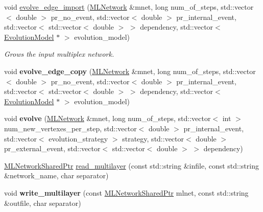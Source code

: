 \begin{DoxyCompactItemize}
\item 
void \hyperlink{namespacemlnet_a2c2827feaeced0d47c7d4180e0204ca4}{evolve\+\_\+edge\+\_\+import} (\hyperlink{classmlnet_1_1_m_l_network}{M\+L\+Network} \&mnet, long num\+\_\+of\+\_\+steps, std\+::vector$<$ double $>$ pr\+\_\+no\+\_\+event, std\+::vector$<$ double $>$ pr\+\_\+internal\+\_\+event, std\+::vector$<$ std\+::vector$<$ double $>$ $>$ dependency, std\+::vector$<$ \hyperlink{classmlnet_1_1_evolution_model}{Evolution\+Model} $\ast$ $>$ evolution\+\_\+model)
\begin{DoxyCompactList}\small\item\em Grows the input multiplex network. \end{DoxyCompactList}\item 
\hypertarget{namespacemlnet_adc031181ba00c2b421f33bbc25c1554a}{void {\bfseries evolve\+\_\+edge\+\_\+copy} (\hyperlink{classmlnet_1_1_m_l_network}{M\+L\+Network} \&mnet, long num\+\_\+of\+\_\+steps, std\+::vector$<$ double $>$ pr\+\_\+no\+\_\+event, std\+::vector$<$ double $>$ pr\+\_\+internal\+\_\+event, std\+::vector$<$ std\+::vector$<$ double $>$ $>$ dependency, std\+::vector$<$ \hyperlink{classmlnet_1_1_evolution_model}{Evolution\+Model} $\ast$ $>$ evolution\+\_\+model)}\label{namespacemlnet_adc031181ba00c2b421f33bbc25c1554a}

\item 
\hypertarget{namespacemlnet_ae6e5b9458562f45633615a0cf41e982a}{void {\bfseries evolve} (\hyperlink{classmlnet_1_1_m_l_network}{M\+L\+Network} \&mnet, long num\+\_\+of\+\_\+steps, std\+::vector$<$ int $>$ num\+\_\+new\+\_\+vertexes\+\_\+per\+\_\+step, std\+::vector$<$ double $>$ pr\+\_\+internal\+\_\+event, std\+::vector$<$ evolution\+\_\+strategy $>$ strategy, std\+::vector$<$ double $>$ pr\+\_\+external\+\_\+event, std\+::vector$<$ std\+::vector$<$ double $>$ $>$ dependency)}\label{namespacemlnet_ae6e5b9458562f45633615a0cf41e982a}

\item 
\hyperlink{namespacemlnet_aa6d3fa87865bcde4d1283abb1942cbbb}{M\+L\+Network\+Shared\+Ptr} \hyperlink{namespacemlnet_a282d13ae5c88b5a0f89798459bb2e500}{read\+\_\+multilayer} (const std\+::string \&infile, const std\+::string \&network\+\_\+name, char separator)
\item 
\hypertarget{namespacemlnet_ac7b268673765d5b2d7861a2fd799e051}{void {\bfseries write\+\_\+multilayer} (const \hyperlink{namespacemlnet_aa6d3fa87865bcde4d1283abb1942cbbb}{M\+L\+Network\+Shared\+Ptr} mlnet, const std\+::string \&outfile, char separator)}\label{namespacemlnet_ac7b268673765d5b2d7861a2fd799e051}


\end{DoxyCompactItemize}
